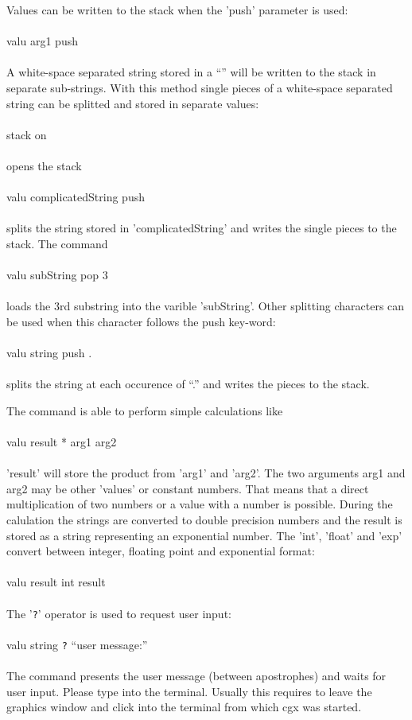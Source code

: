 \documentclass{article}
\begin{document}
Values can be written to the stack when the 'push' parameter is used:\\\\valu arg1 push\\\\A white-space separated string stored in a ``'' will be written to the stack in separate sub-strings. With this method single pieces of a white-space separated string can be splitted and stored in separate values:\\\\stack on\\\\opens the stack\\\\valu complicatedString push\\\\splits the string stored in 'complicatedString' and writes the single pieces to the stack. The command \\\\valu subString pop 3\\\\loads the 3rd substring into the varible 'subString'. Other splitting characters can be used when this character follows the push key-word:\\\\valu string push .\\\\splits the string at each occurence of ``.'' and writes the pieces to the stack. 

The command is able to perform simple calculations like\\\\valu result * arg1 arg2\\\\'result' will store the product from 'arg1' and 'arg2'. The two arguments arg1 and arg2 may be other 'values' or constant numbers. That means that a direct multiplication of two numbers or a value with a number is possible. During the calulation the strings are converted to double precision numbers and the result is stored as a string representing an exponential number. The 'int', 'float' and 'exp' convert between integer, floating point and exponential format:\\\\valu result int result\\\\

The '\verb_?_' operator is used to request user input:\\\\valu string \verb_?_ ``user message:''\\\\The command presents the user message (between apostrophes) and waits for user input. Please type into the terminal. Usually this requires to leave the graphics window and click into the terminal from which cgx was started.
\end{document}
